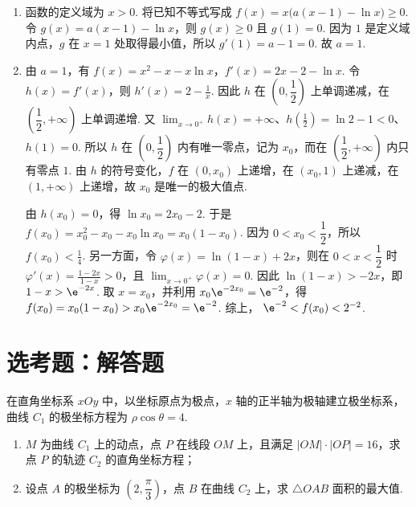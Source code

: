 \begin{solution}
\begin{enumerate}
\item 函数的定义域为 \(x>0\). 将已知不等式写成
\(f(x)=x\bigl(a(x-1)-\ln x\bigr)\ge0\).
令 \(g(x)=a(x-1)-\ln x\)，则 \(g(x)\ge0\) 且 \(g(1)=0\). 因为 \(1\) 是定义域内点，\(g\) 在 \(x=1\) 处取得最小值，所以
\(g'(1)=a-1=0\).
故 \(a=1\).

\item 由 \(a=1\)，有 \(f(x)=x^2-x-x\ln x\)，\(f'(x)=2x-2-\ln x\).
令 \(h(x)=f'(x)\)，则
\(h'(x)=2-\frac1x\).
 因此 \(h\) 在 \(\left(0,\dfrac12\right)\) 上单调递减，在 \(\left(\dfrac12,+\infty\right)\) 上单调递增. 又
\(\displaystyle\lim_{x\to0^+}h(x)=+\infty\)、\(h\left(\frac12\right)=\ln2-1<0\)、\(h(1)=0\).
所以 \(h\) 在 \(\left(0,\dfrac12\right)\) 内有唯一零点，记为 \(x_0\)，而在 \(\left(\dfrac12,+\infty\right)\) 内只有零点 \(1\). 由 \(h\) 的符号变化，\(f\) 在 \((0,x_0)\) 上递增，在 \((x_0,1)\) 上递减，在 \((1,+\infty)\) 上递增，故 \(x_0\) 是唯一的极大值点.

由 \(h(x_0)=0\)，得
\(\ln x_0=2x_0-2\).
于是
\(f(x_0)=x_0^2-x_0-x_0\ln x_0=x_0(1-x_0)\).
因为 \(0<x_0<\dfrac12\)，所以
\(f(x_0)<\frac14\).
另一方面，令 \(\varphi(x)=\ln(1-x)+2x\)，则在 \(0<x<\dfrac12\) 时
\(\varphi'(x)=\frac{1-2x}{1-x}>0\)，且 \(\displaystyle\lim_{x\to0^+}\varphi(x)=0\).
因此 \(\ln(1-x)>-2x\)，即 \(1-x>\e^{-2x}\). 取 \(x=x_0\)，并利用 \(x_0\e^{-2x_0}=\e^{-2}\)，得
\(f(x_0)=x_0(1-x_0)>x_0\e^{-2x_0}=\e^{-2}\).
综上，
\(\e^{-2}<f(x_0)<2^{-2}\).
\end{enumerate}
\end{solution}

\section{选考题：解答题}

\begin{problem}
在直角坐标系 \(xOy\) 中，以坐标原点为极点，\(x\) 轴的正半轴为极轴建立极坐标系，曲线 \(C_1\) 的极坐标方程为 \(\rho\cos\theta=4\).

\begin{enumerate}
\item \(M\) 为曲线 \(C_1\) 上的动点，点 \(P\) 在线段 \(OM\) 上，且满足 \(|OM|\cdot|OP|=16\)，求点 \(P\) 的轨迹 \(C_2\) 的直角坐标方程；
\item 设点 \(A\) 的极坐标为 \(\left(2,\dfrac{\pi}{3}\right)\)，点 \(B\) 在曲线 \(C_2\) 上，求 \(\triangle OAB\) 面积的最大值.
\end{enumerate}
\end{problem}

